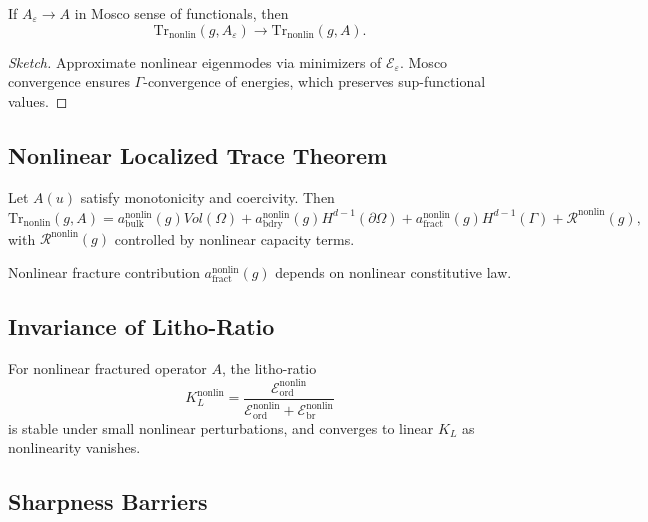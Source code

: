 \begin{theorem}
If $A_\varepsilon \to A$ in Mosco sense of functionals, then
\[
\mathrm{Tr}_{\mathrm{nonlin}}(g,A_\varepsilon) \to \mathrm{Tr}_{\mathrm{nonlin}}(g,A).
\]
\end{theorem}

\begin{proof}[Sketch]
Approximate nonlinear eigenmodes via minimizers of $\mathcal{E}_\varepsilon$.  
Mosco convergence ensures $\Gamma$-convergence of energies, which preserves sup-functional values.  
\end{proof}

\subsection{Nonlinear Localized Trace Theorem}

\begin{theorem}
Let $A(u)$ satisfy monotonicity and coercivity.  
Then
\[
\mathrm{Tr}_{\mathrm{nonlin}}(g,A) = a_{\mathrm{bulk}}^{\mathrm{nonlin}}(g) Vol(\Omega) 
+ a_{\mathrm{bdry}}^{\mathrm{nonlin}}(g) H^{d-1}(\partial \Omega)
+ a_{\mathrm{fract}}^{\mathrm{nonlin}}(g) H^{d-1}(\Gamma) + \mathcal{R}^{\mathrm{nonlin}}(g),
\]
with $\mathcal{R}^{\mathrm{nonlin}}(g)$ controlled by nonlinear capacity terms.  
\end{theorem}

\begin{remark}
Nonlinear fracture contribution $a_{\mathrm{fract}}^{\mathrm{nonlin}}(g)$ depends on nonlinear constitutive law.  
\end{remark}

\subsection{Invariance of Litho-Ratio}

\begin{theorem}
For nonlinear fractured operator $A$, the litho-ratio
\[
K_L^{\mathrm{nonlin}} = \frac{\mathcal{E}_{\mathrm{ord}}^{\mathrm{nonlin}}}{\mathcal{E}_{\mathrm{ord}}^{\mathrm{nonlin}}+\mathcal{E}_{\mathrm{br}}^{\mathrm{nonlin}}}
\]
is stable under small nonlinear perturbations, and converges to linear $K_L$ as nonlinearity vanishes.  
\end{theorem}

\subsection{Sharpness Barriers}

